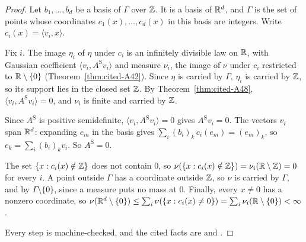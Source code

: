 \begin{proof}
\leanok
Let $b_1, \dots, b_d$ be a basis of $\Gamma$ over $\mathbb{Z}$. It is a basis of $\mathbb{R}^d$, and $\Gamma$ is the
set of points whose coordinates $c_1(x), \dots, c_d(x)$ in this basis are integers. Write
$c_i(x) = \langle v_i, x\rangle$.

Fix $i$. The image $\eta_i$ of $\eta$ under $c_i$ is an infinitely divisible law on $\mathbb{R}$, with
Gaussian coefficient $\langle v_i, A^{\mathrm S}v_i\rangle$ and \Levy{} measure $\nu_i$, the image of $\nu$
under $c_i$ restricted to $\mathbb{R} \setminus \{0\}$ (Theorem~\ref{thm:cited-A42}). Since $\eta$ is
carried by $\Gamma$, $\eta_i$ is carried by $\mathbb{Z}$, so its support lies in the closed set $\mathbb{Z}$. By
Theorem~\ref{thm:cited-A48}, $\langle v_i, A^{\mathrm S}v_i\rangle = 0$, and $\nu_i$ is finite and carried
by $\mathbb{Z}$.

Since $A^{\mathrm S}$ is positive semidefinite, $\langle v_i, A^{\mathrm S}v_i\rangle = 0$ gives $A^{\mathrm S}v_i = 0$. The vectors
$v_i$ span $\mathbb{R}^d$: expanding $e_m$ in the basis gives $\sum_i(b_i)_k\,c_i(e_m) = (e_m)_k$, so
$e_k = \sum_i(b_i)_kv_i$. So $A^{\mathrm S} = 0$.

The set $\{x : c_i(x) \notin \mathbb{Z}\}$ does not contain $0$, so
$\nu(\{x : c_i(x) \notin \mathbb{Z}\}) = \nu_i(\mathbb{R} \setminus \mathbb{Z}) = 0$ for every $i$. A point outside
$\Gamma$ has a coordinate outside $\mathbb{Z}$, so $\nu$ is carried by $\Gamma$, and by
$\Gamma \setminus \{0\}$, since a \Levy{} measure puts no mass at $0$. Finally, every $x \ne 0$ has
a nonzero coordinate, so
$\nu(\mathbb{R}^d \setminus \{0\}) \le \sum_i\nu(\{x : c_i(x) \ne 0\}) = \sum_i\nu_i(\mathbb{R} \setminus \{0\}) < \infty$.

Every step is machine-checked, and the cited facts are  and .
\end{proof}

